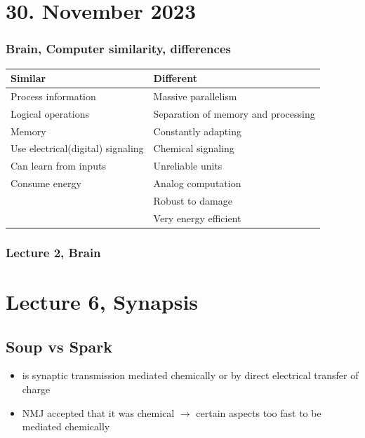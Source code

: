 \documentclass{article}
\begin{document}
\section*{30. November 2023}



\subsubsection*{Brain, Computer similarity, differences}

\begin{center}
\begin{tabular}{ |m{6em}|m{10cm}| }
\hline
Similar & Different \\
\hline
Process information & Massive parallelism \\
Logical operations & Separation of memory and processing \\
Memory & Constantly adapting \\
Use electrical(digital) signaling & Chemical signaling \\
Can learn from inputs & Unreliable units \\
Consume energy & Analog computation \\
 & Robust to damage \\
 & Very energy efficient \\
\hline
\end{tabular}
\end{center}

\subsubsection*{Lecture 2, Brain}



\section*{Lecture 6, Synapsis}

\subsection*{Soup vs Spark}

\begin{itemize}
    \item is synaptic transmission mediated chemically or by direct electrical transfer of charge
    \item NMJ accepted that it was chemical $\rightarrow$ certain aspects too fast to be mediated chemically
\end{itemize}
\end{document}
